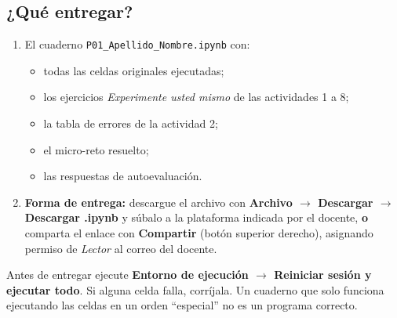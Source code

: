 \documentclass[11pt,a4paper]{article}
\newcommand{\code}[1]{\texttt{#1}}
\newcommand{\menu}[1]{\textbf{\color{moradoOsc}#1}}
\begin{document}
\subsection{¿Qué entregar?}
\begin{enumerate}
  \item El cuaderno \code{P01\_Apellido\_Nombre.ipynb} con:
  \begin{itemize}[nosep]
    \item todas las celdas originales ejecutadas;
    \item los ejercicios \emph{Experimente usted mismo} de las actividades 1 a 8;
    \item la tabla de errores de la actividad 2;
    \item el micro-reto resuelto;
    \item las respuestas de autoevaluación.
  \end{itemize}
  \item \textbf{Forma de entrega:} descargue el archivo con \menu{Archivo $\rightarrow$ Descargar $\rightarrow$ Descargar .ipynb} y súbalo a la plataforma indicada por el docente, \textbf{o} comparta el enlace con \menu{Compartir} (botón superior derecho), asignando permiso de \emph{Lector} al correo del docente.
\end{enumerate}

\begin{warn}
Antes de entregar ejecute \menu{Entorno de ejecución $\rightarrow$ Reiniciar sesión y ejecutar todo}. Si alguna celda falla, corríjala. Un cuaderno que solo funciona ejecutando las celdas en un orden ``especial'' no es un programa correcto.
\end{warn}
\end{document}
